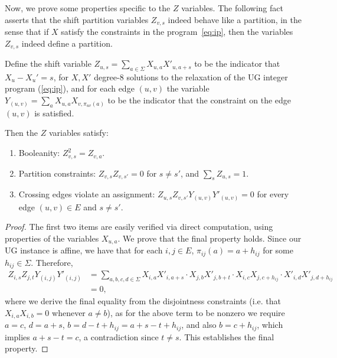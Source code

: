 Now, we prove some properties specific to the $Z$ variables. 
The following fact asserts that the shift partition variables 
$Z_{v,s}$ indeed behave like a partition, in the sense 
that if $X$ satisfy the constraints in the program~\ref{eq:ip}, 
then the variables $Z_{v,s}$ indeed define a partition.
\begin{fact}\label{fact:z-vars}
Define the shift variable $Z_{u,s} = \sum_{a \in \Sigma} X_{u,a}X'_{u,a+s}$ to be the indicator that $X_u - X_u' = s$, for $X,X'$ degree-$8$ solutions to the \sos relaxation of the UG integer program (\ref{eq:ip}), and for each edge $(u,v)$ the variable $Y_{(u,v)} = \sum_{a} X_{u,a} X_{v, \pi_{uv}(a)}$ to be the indicator that the constraint on the edge $(u,v)$ is satisfied.

Then the $Z$ variables satisfy:
\begin{enumerate}
\item Booleanity: $Z_{v,s}^2 = Z_{v,a}$. 
\item Partition constraints: $Z_{v,s}Z_{v,s'} = 0$ for $s \neq s'$, and $\sum_{s} Z_{u,s} = 1$.
\item Crossing edges violate an assignment: $Z_{u,s} Z_{v,s'} Y_{(u,v)} Y'_{(u,v)} = 0$ for every edge $(u,v) \in E$ and $s \neq s'$. 
\end{enumerate}
\end{fact}
\begin{proof}
The first two items are easily verified via direct computation, using properties of the variables $X_{u,a}$.
We prove that the final property holds.
Since our UG instance is affine, we have that for each $i,j \in E$, $\pi_{ij}(a) = a + h_{ij}$ for some $h_{ij} \in \Sigma$.
 Therefore,
 \begin{align*}
 Z_{i,s} Z_{j,t}Y_{(i,j)}Y'_{(i,j)}
 &= \sum_{a,b,c,d \in \Sigma} X_{i,a}X'_{i,a+s} \cdot X_{j,b}X'_{j,b+t} \cdot X_{i,c}X_{j,c + h_{ij}} \cdot X'_{i,d} X'_{j,d+h_{ij}}\\
 &= 0,
 \end{align*}
 where we derive the final equality from the disjointness constraints (i.e. that $X_{i,a}X_{i,b} = 0$ whenever $a \neq b$), as for the above term to be nonzero we require $a = c$, $d = a + s$, $b = d - t + h_{ij} = a + s - t + h_{ij}$, and also $b = c + h_{ij}$, which implies $a + s - t = c$, a contradiction since $t \neq s$.
This establishes the final property.
\end{proof}

